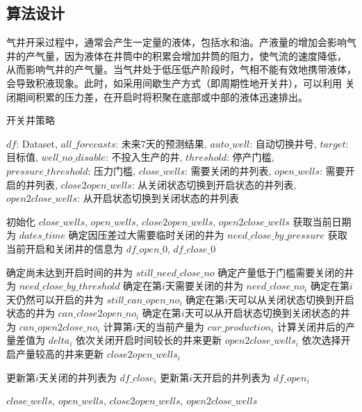 \subsection{算法设计}
气井开采过程中，通常会产生一定量的液体，包括水和油。产液量的增加会影响气井的产气量，因为液体在井筒中的积累会增加井筒的阻力，使气流的速度降低，
从而影响气井的产气量。当气井处于低压低产阶段时，气相不能有效地携带液体，会导致积液现象。此时，如采用间歇生产方式（即周期性地开关井），可以利用
关闭期间积累的压力差，在开启时将积聚在底部或中部的液体迅速排出。
\begin{algorithm}[H]
    \baselineskip=20pt
    \caption{开关井策略}
    \label{al:openclose}
    \begin{algorithmic}[1]
    \Require $df$: Dataset, $all\_forecasts$: 未来7天的预测结果, $auto\_well$: 自动切换井号, $target$: 目标值, $well\_no\_disable$: 不投入生产的井, $threshold$: 停产门槛, $pressure\_threshold$: 压力门槛,
    \Ensure $close\_wells$: 需要关闭的井列表, $open\_wells$: 需要开启的井列表, $close2open\_wells$: 从关闭状态切换到开启状态的井列表, $open2close\_wells$: 从开启状态切换到关闭状态的井列表
    
    \State 初始化 $close\_wells$, $open\_wells$, $close2open\_wells$, $open2close\_wells$
    \State 获取当前日期为 $dates\_time$
    \State 确定因压差过大需要临时关闭的井为 $need\_close\_by\_pressure$
    \State 获取当前开启和关闭井的信息为 $df\_open\_0$, $df\_close\_0$
    
        \State 确定尚未达到开启时间的井为 $still\_need\_close\_no$
        \State 确定产量低于门槛需要关闭的井为 $need\_close\_by\_threshold$
        \State 确定在第$i$天需要关闭的井为 $need\_close\_no_i$ 
        \State 确定在第$i$天仍然可以开启的井为 $still\_can\_open\_no_i$ 
        \State 确定在第$i$天可以从关闭状态切换到开启状态的井为 $can\_close2open\_no_i$ 
        \State 确定在第$i$天可以从开启状态切换到关闭状态的井为 $can\_open2close\_no_i$ 
        \State 计算第$i$天的当前产量为 $cur\_production_i$
        \State 计算关闭井后的产量差值为 $delta_i$ 
            \State 依次关闭开启时间较长的井来更新 $open2close\_wells_i$
        \Else
            \State 依次选择开启产量较高的井来更新 $close2open\_wells_i$
        \EndIf
        
        \State 更新第$i$天关闭的井列表为 $df\_close_i$
        \State 更新第$i$天开启的井列表为 $df\_open_i$
    \EndFor
    
    \State \Return $close\_wells$, $open\_wells$, $close2open\_wells$, $open2close\_wells$
    
    \end{algorithmic}
  \end{algorithm}

